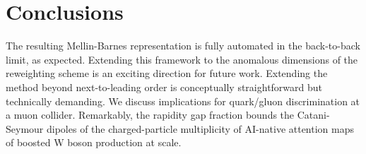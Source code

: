 \section{Conclusions}\label{sec:conclusions}

The resulting Mellin-Barnes representation is fully automated in the
back-to-back limit, as expected. Extending this framework to the
anomalous dimensions of the reweighting scheme is an exciting direction
for future work. Extending the method beyond next-to-leading order is
conceptually straightforward but technically demanding. We discuss
implications for quark/gluon discrimination at a muon collider.
Remarkably, the rapidity gap fraction bounds the Catani-Seymour dipoles
of the charged-particle multiplicity of AI-native attention maps of
boosted W boson production at scale.

